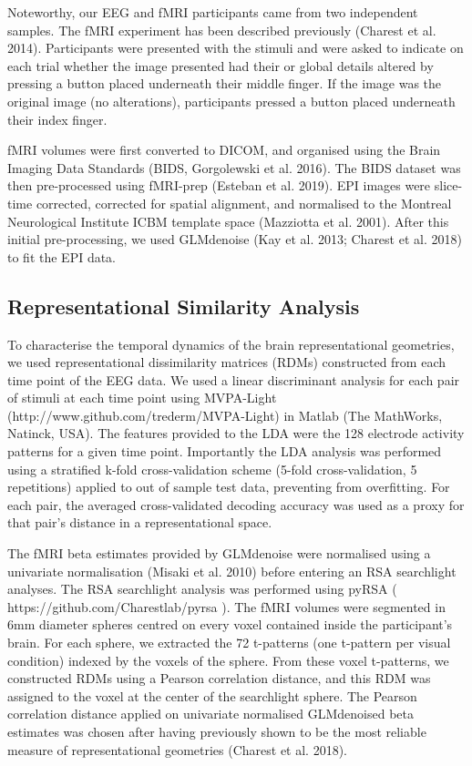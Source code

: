 \documentclass[10pt,letterpaper]{article}
\begin{document}
Noteworthy, our EEG and fMRI participants came from two independent 
samples.  The fMRI experiment has been described previously 
(Charest et al. 2014). Participants were presented with the 
stimuli and were asked to indicate on each trial whether the 
image presented had their or global details altered by pressing 
a button placed underneath their middle finger. If the image was 
the original image (no alterations), participants pressed a button 
placed underneath their index finger.  

fMRI volumes were first converted to DICOM, and organised using the 
Brain Imaging Data Standards (BIDS, Gorgolewski et al. 2016). The 
BIDS dataset was then pre-processed using fMRI-prep (Esteban et al. 2019). 
EPI images were slice-time corrected, corrected for spatial alignment, 
and normalised to the Montreal Neurological Institute ICBM template 
space (Mazziotta et al. 2001). After this initial pre-processing, we 
used GLMdenoise (Kay et al. 2013; Charest et al. 2018) to fit the 
EPI data. 

\subsection{Representational Similarity Analysis}

To characterise the temporal dynamics of the brain representational 
geometries, we used representational dissimilarity matrices (RDMs) 
constructed from each time point of the EEG data. We used a linear 
discriminant analysis for each pair of stimuli at each time point 
using MVPA-Light (http://www.github.com/trederm/MVPA-Light) in 
Matlab (The MathWorks, Natinck, USA). The features provided to 
the LDA were the 128 electrode activity patterns for a given time 
point. Importantly the LDA analysis was performed using a stratified 
k-fold cross-validation scheme (5-fold cross-validation, 5 repetitions) 
applied to out of sample test data, preventing from overfitting. For 
each pair, the averaged cross-validated decoding accuracy was used 
as a proxy for that pair’s distance in a representational space.

The fMRI beta estimates provided by GLMdenoise were normalised 
using a univariate normalisation (Misaki et al. 2010) before 
entering an RSA searchlight analyses. The RSA searchlight analysis 
was performed using pyRSA ( https://github.com/Charestlab/pyrsa ).  
The fMRI volumes were segmented in 6mm diameter spheres centred 
on every voxel contained inside the participant’s brain. For each 
sphere, we extracted the 72 t-patterns (one t-pattern per visual 
condition) indexed by the voxels of the sphere. From these voxel 
t-patterns, we constructed RDMs using a Pearson correlation distance, 
and this RDM was assigned to the voxel at the center of the 
searchlight sphere. The Pearson correlation distance applied on 
univariate normalised GLMdenoised beta estimates was chosen after 
having previously shown to be the most reliable measure of 
representational geometries (Charest et al. 2018). 
\end{document}
